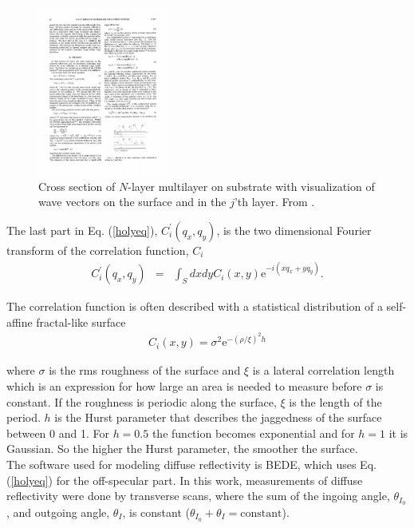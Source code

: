 \begin{figure}[!ht] %
	\centering
		\includegraphics[height=2.2in]{figures/xray_app/holykvector.pdf}
	\caption{Cross section of $N$-layer multilayer on substrate with visualization of wave vectors on the surface and in the $j$'th layer. From \cite{Holy:1993p5469}.}
	\label{fig:holykvector}
\end{figure}

The last part in Eq. (\ref{holyeq}), $C_i^{'} (q_x,q_y)$, is the two dimensional Fourier transform of the correlation function, $C_i$
\begin{eqnarray}
	C_i^{'} (q_x,q_y) &=& \int_S dxdy C_i(x,y)\mathrm{e}^{-i(xq_x +yq_y)}.
\end{eqnarray}

The correlation function is often described with a statistical distribution of a self-affine fractal-like surface\cite{Sinha:1988uu}
\begin{eqnarray}
	C_i (x,y) = \sigma^2 \mathrm{e}^{-(\rho/\xi)^2h}
\end{eqnarray}

where $\sigma$ is the rms roughness of the surface and $\xi$ is a lateral correlation length which is an expression for how large an area is needed to measure before $\sigma$ is constant. If the roughness is periodic along the surface, $\xi$ is the length of the period. $h$ is the Hurst parameter that describes the jaggedness of the surface between 0 and 1. For $h=0.5$ the function becomes exponential and for $h=1$ it is Gaussian. So the higher the Hurst parameter, the smoother the surface.\\

The software used for modeling diffuse reflectivity is BEDE\cite{Wormington:1992vm}, which uses Eq. (\ref{holyeq}) for the off-specular part. In this work, measurements of diffuse reflectivity were done by transverse scans, where the sum of the ingoing angle, $\theta_{I_0}$, and outgoing angle, $\theta_I$, is constant ($\theta_{I_0} + \theta_I=\mathrm{constant}$). \\

